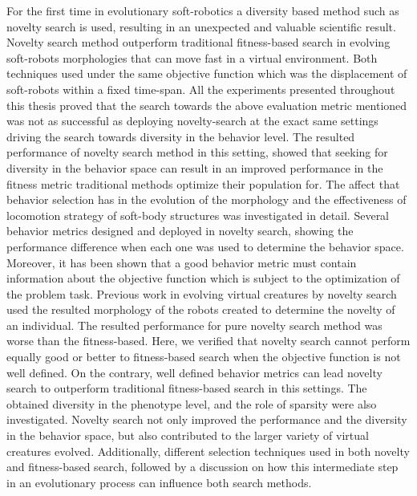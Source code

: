 For the first time in evolutionary soft-robotics a diversity based method such as novelty search is used, resulting in an unexpected and valuable scientific result. Novelty search method outperform traditional fitness-based search in evolving soft-robots morphologies that can move fast in a virtual environment.
Both techniques used under the same objective function which was the displacement of soft-robots within a fixed time-span. All the experiments presented throughout this thesis proved that the search towards the above evaluation metric mentioned was not as successful as deploying novelty-search at the exact same settings driving the search towards diversity in the behavior level. The resulted performance of novelty search method in this setting, showed that seeking for diversity in the behavior space can result in an improved performance in the fitness metric traditional methods optimize their population for. The affect that behavior selection has in the evolution of the morphology and the effectiveness of locomotion strategy of soft-body structures was investigated in detail. Several behavior metrics designed and deployed in novelty search, showing the performance difference when each one was used to determine the behavior space. Moreover, it has been shown that a good behavior metric must contain information about the objective function which is subject to the optimization of the problem task. Previous work in evolving virtual creatures by novelty search~\citep{lehman2011evolving} used the resulted morphology of the robots created to determine the novelty of an individual. The resulted performance for pure novelty search method was worse than the fitness-based. Here, we verified that novelty search cannot perform equally good or better to fitness-based search when the objective function is not well defined. On the contrary, well defined behavior metrics can lead novelty search to outperform traditional fitness-based search in this settings. The obtained diversity in the phenotype level, and the role of sparsity were also investigated. Novelty search not only improved the performance and the diversity in the behavior space, but also contributed to the larger variety of virtual creatures evolved. Additionally, different selection techniques used in both novelty and fitness-based search, followed by a discussion on how this intermediate step in an evolutionary process can influence both search methods. 

